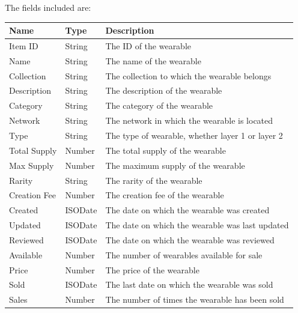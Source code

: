 \documentclass[MSE,Master,english]{twbook}%
\begin{document}
The fields included are:
\begin{table}[H]
  \centering
  \begin{tabularx}{\textwidth}{|l|l|X|}
  \hline
  \textbf{Name} & \textbf{Type} & \textbf{Description}                                            \\ \hline
  Item ID      & String  & The ID of the wearable                           \\ \hline
  Name         & String  & The name of the wearable                         \\ \hline
  Collection   & String  & The collection to which the wearable belongs     \\ \hline
  Description  & String  & The description of the wearable                  \\ \hline
  Category     & String  & The category of the wearable                     \\ \hline
  Network      & String  & The network in which the wearable is located     \\ \hline
  Type         & String  & The type of wearable, whether layer 1 or layer 2 \\ \hline
  Total Supply & Number  & The total supply of the wearable                 \\ \hline
  Max Supply   & Number  & The maximum supply of the wearable               \\ \hline
  Rarity       & String  & The rarity of the wearable                       \\ \hline
  Creation Fee & Number  & The creation fee of the wearable                 \\ \hline
  Created      & ISODate & The date on which the wearable was created       \\ \hline
  Updated      & ISODate & The date on which the wearable was last updated  \\ \hline
  Reviewed     & ISODate & The date on which the wearable was reviewed      \\ \hline
  Available    & Number  & The number of wearables available for sale       \\ \hline
  Price        & Number  & The price of the wearable                        \\ \hline
  Sold         & ISODate & The last date on which the wearable was sold     \\ \hline
  Sales        & Number  & The number of times the wearable has been sold   \\ \hline

\end{tabularx}
\end{table}
\end{document}
